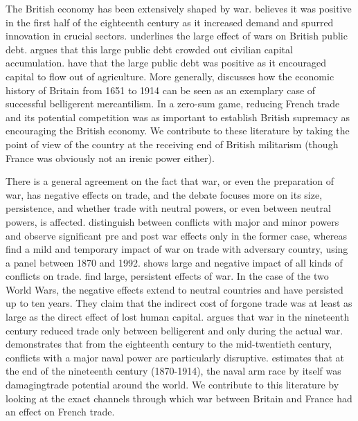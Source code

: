 \documentclass[12pt,a4paper,notitlepage,english]{article}
\begin{document}
The British economy has been extensively shaped by war.
\cite{John1955} believes it was positive in the first half of the eighteenth century as it increased demand and spurred innovation in crucial sectors.
\cite{Eloranta2011} underlines the large effect of wars on British public debt.
\cite{Williamson1984} argues that this large public debt crowded out civilian capital accumulation.
\cite{Ventura2015} have that the large public debt was positive as it encouraged capital to flow out of agriculture.
More generally, \cite{OBrien2018} discusses how the economic history of Britain from 1651 to 1914 can be seen as an exemplary case of successful belligerent mercantilism.
In a zero-sum game, reducing French trade and its potential competition was as important to establish British supremacy as encouraging the British economy.
We contribute to these literature by taking the point of view of the country at the receiving end of British militarism (though France was obviously not an irenic power either).

There is a general agreement on the fact that war, or even the preparation of war, has negative effects on trade, and the debate focuses more on its size, persistence, and whether trade with neutral powers, or even between neutral powers, is affected.
\cite{Anderton2001} distinguish between conflicts with major and minor powers and observe significant pre and post war effects only in the former case, whereas \cite{Levy2004} find a mild and temporary impact of war on trade with adversary country, using a panel between 1870 and 1992.
\cite{Blomberg2006} shows large and negative impact of all kinds of conflicts on trade. 
\cite{Glick2010} find large, persistent effects of war.
In the case of the two World Wars, the negative effects extend to neutral countries and have persisted up to ten years.  
They claim that the indirect cost of forgone trade was at least as large as the direct effect of lost human capital.
\cite{Karlsson2021} argues that war in the nineteenth century reduced trade only between belligerent and only during the actual war.
\cite{Rahman2010} demonstrates that from the eighteenth century to the mid-twentieth century, conflicts with a major naval power are particularly disruptive.
\cite{Glaser2016} estimates that at the end of the nineteenth century (1870-1914), the naval arm race by itself was damagingtrade potential around the world.
We contribute to this literature by looking at the exact channels through which war between Britain and France had an effect on French trade.
\end{document}
